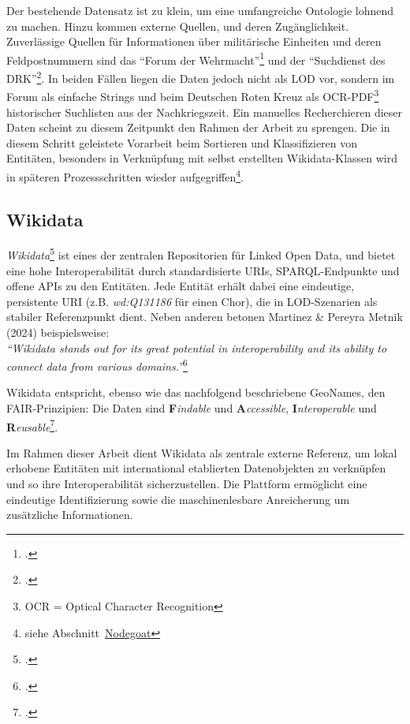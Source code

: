 \documentclass[12pt, a4paper, ngerman, bidi=default]{article}
\let\cite\footcite
\begin{document}
Der bestehende Datensatz ist zu klein, um eine umfangreiche Ontologie lohnend zu machen. Hinzu kommen externe Quellen, und deren Zugänglichkeit. Zuverlässige Quellen für Informationen 
über militärische Einheiten und deren Feldpostnummern sind das \enquote{Forum der Wehrmacht}\cite[ vgl.][]{altenburger_lexikon_nodate} 
und der \enquote{Suchdienst des DRK}\cite[ vgl.][]{reuter_drk_2025}. In beiden Fällen liegen die Daten jedoch nicht als LOD vor, sondern im Forum als einfache Strings 
und beim Deutschen Roten Kreuz als OCR-PDF\footnote{OCR = Optical Character Recognition} historischer Suchlisten aus der Nachkriegszeit. Ein manuelles Recherchieren dieser Daten scheint zu diesem Zeitpunkt
den Rahmen der Arbeit zu sprengen. Die in diesem Schritt geleistete Vorarbeit beim Sortieren und Klassifizieren von Entitäten, besonders in Verknüpfung mit selbst erstellten Wikidata-Klassen 
wird in späteren Prozessschritten wieder aufgegriffen\footnote{siehe Abschnitt~\hyperref[subsec:Nodegoat_chapter]{Nodegoat}}.

\subsection{Wikidata}

\textit{Wikidata}\cite[vgl.][]{noauthor_wikidata_nodate} ist eines der zentralen Repositorien für Linked Open Data, und bietet eine hohe Interoperabilität durch standardisierte
URIs, SPARQL-Endpunkte und offene APIs zu den Entitäten.
Jede Entität erhält dabei eine eindeutige, persistente URI 
(z.B. \colorbox{VeryLightGray}{\textit{wd:Q131186}} für einen Chor), die in LOD-Szenarien 
als stabiler Referenzpunkt dient.
Neben anderen betonen Martinez \& Pereyra Metnik (2024) beispielsweise: \\
\textit{\enquote{Wikidata stands out for its great potential in interoperability and its ability to connect data from various domains.}}\cite{martinez_comparative_nodate}

Wikidata entspricht, ebenso wie das nachfolgend beschriebene GeoNames, den FAIR-Prinzipien: Die Daten sind 
\textbf{F}\textit{indable} und \textbf{A}\textit{ccessible}, \textbf{I}\textit{nteroperable} und \textbf{R}\textit{eusable}\cite[ vgl.][S. 2]{wilkinson_fair_2016}.

Im Rahmen dieser Arbeit dient Wikidata als zentrale externe Referenz, um lokal erhobene Entitäten mit international etablierten Datenobjekten 
zu verknüpfen und so ihre Interoperabilität sicherzustellen. Die Plattform ermöglicht eine eindeutige Identifizierung sowie die maschinenlesbare 
Anreicherung um zusätzliche Informationen.
\end{document}
